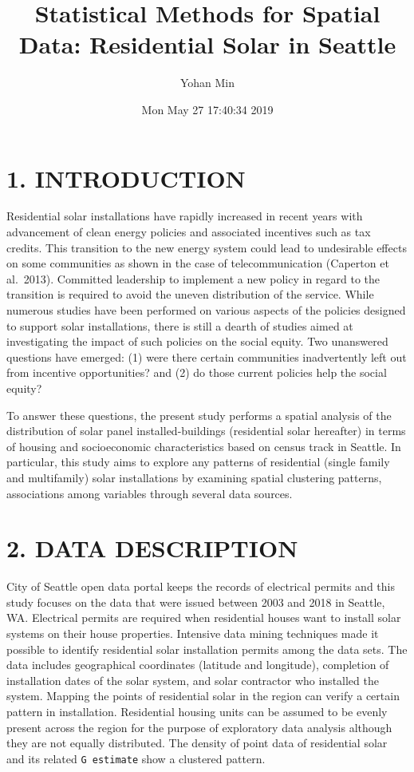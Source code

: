 \documentclass[11pt,]{article}
\title{Statistical Methods for Spatial Data: Residential Solar in Seattle}
\author{Yohan Min}
\date{Mon May 27 17:40:34 2019}
\begin{document}
\maketitle

\fontsize{11}{16}
\selectfont

\hypertarget{introduction}{%
\section{1. INTRODUCTION}\label{introduction}}

Residential solar installations have rapidly increased in recent years
with advancement of clean energy policies and associated incentives such
as tax credits. This transition to the new energy system could lead to
undesirable effects on some communities as shown in the case of
telecommunication (Caperton et al.~2013). Committed leadership to
implement a new policy in regard to the transition is required to avoid
the uneven distribution of the service. While numerous studies have been
performed on various aspects of the policies designed to support solar
installations, there is still a dearth of studies aimed at investigating
the impact of such policies on the social equity. Two unanswered
questions have emerged: (1) were there certain communities inadvertently
left out from incentive opportunities? and (2) do those current policies
help the social equity?

To answer these questions, the present study performs a spatial analysis
of the distribution of solar panel installed-buildings (residential
solar hereafter) in terms of housing and socioeconomic characteristics
based on census track in Seattle. In particular, this study aims to
explore any patterns of residential (single family and multifamily)
solar installations by examining spatial clustering patterns,
associations among variables through several data sources.

\hypertarget{data-description}{%
\section{2. DATA DESCRIPTION}\label{data-description}}

City of Seattle open data portal keeps the records of electrical permits
and this study focuses on the data that were issued between 2003 and
2018 in Seattle, WA. Electrical permits are required when residential
houses want to install solar systems on their house properties.
Intensive data mining techniques made it possible to identify
residential solar installation permits among the data sets. The data
includes geographical coordinates (latitude and longitude), completion
of installation dates of the solar system, and solar contractor who
installed the system. Mapping the points of residential solar in the
region can verify a certain pattern in installation. Residential housing
units can be assumed to be evenly present across the region for the
purpose of exploratory data analysis although they are not equally
distributed. The density of point data of residential solar and its
related \texttt{G\ estimate} show a clustered pattern.
\end{document}
